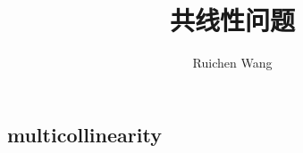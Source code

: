 \documentclass{article}
\author{Ruichen Wang}
\title{共线性问题}
\begin{document}
\begin{CJK*}{UTF8}{gbsn}

\maketitle

\section{multicollinearity}


\end{CJK*}
\end{document}
